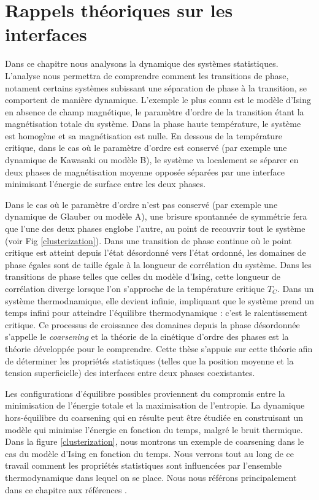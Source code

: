 \chapter{Rappels théoriques sur les interfaces}

Dans ce chapitre nous analysons la dynamique des systèmes statistiques. L'analyse nous permettra de comprendre comment les transitions de phase, notament certains systèmes subissant une séparation de phase à la transition, se comportent de manière dynamique. L'exemple le plus connu est le modèle d'Ising en absence de champ magnétique, le paramètre d'ordre de la transition étant la magnétisation totale du système. Dans la phase haute température, le système est homogène et sa magnétisation est nulle. En dessous de la température critique, dans le cas où le paramètre d'ordre est conservé (par exemple une dynamique de Kawasaki ou modèle B), le système va localement se séparer en deux phases de magnétisation moyenne opposée séparées par une interface minimisant l'énergie de surface entre les deux phases. 

Dans le cas où le paramètre d'ordre n'est pas conservé (par exemple une dynamique de Glauber ou modèle A), une brisure spontannée de symmétrie fera que l'une des deux phases englobe l'autre, au point de recouvrir tout le système (voir Fig \ref{clusterization}). Dans une transition de phase continue où le point critique est atteint depuis l'état désordonné vers l'état ordonné, les domaines de phase égales sont de taille égale à la longueur de corrélation du système. Dans les transitions de phase telles que celles du modèle d'Ising, cette longueur de corrélation diverge lorsque l'on s'approche de la température critique $T_C$. Dans un système thermodnamique, elle devient infinie, impliquant que le système prend un temps infini pour atteindre l'équilibre thermodynamique : c'est le ralentissement critique. Ce processus de croissance des domaines depuis la phase désordonnée s'appelle le \textit{coarsening} et la théorie de la cinétique d'ordre des phases est la théorie développée pour le comprendre.
Cette thèse s'appuie sur cette théorie afin de déterminer les propriétés statistiques (telles que la position moyenne et la tension superficielle) des interfaces entre deux phases coexistantes.

Les configurations d'équilibre possibles proviennent du compromis entre la minimisation de l'énergie totale et la maximisation de l'entropie. La dynamique hors-équilibre du coarsening qui en résulte peut être étudiée en construisant un modèle qui  minimise l'énergie en fonction du temps, malgré le bruit thermique. Dans la figure \ref{clusterization}, nous montrons un exemple de coarsening dans le cas du modèle d'Ising en fonction du temps. Nous verrons tout au long de ce travail comment les propriétés statistiques sont influencées par l'ensemble thermodynamique dans lequel on se place. Nous nous référons principalement dans ce chapitre aux références \cite{hohenberg_theory_1977,bray_theory_1994,krapivsky_kinetic_2010,halpin-healy_kinetic_1995}.

